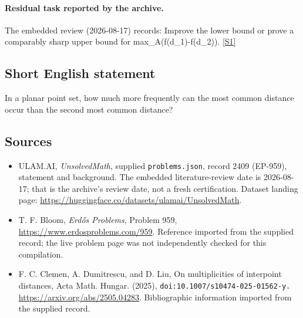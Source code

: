 \documentclass[11pt,a4paper]{article}
\newcommand{\sref}[2]{\hyperlink{source:#1:#2}{[S#2]}}
\begin{document}
\paragraph{Residual task reported by the archive.}

The embedded review (2026-08-17) records: Improve the lower bound or prove a comparably sharp upper bound for max\_A(f(d\_1)-f(d\_2)). \sref{2409}{1}

\subsection{Short English statement}

In a planar point set, how much more frequently can the most common distance occur than the second most common distance?

\subsection{Sources}

{\small

\begin{itemize}

\item[\hypertarget{source:2409:1}{S1}] ULAM.AI, \emph{UnsolvedMath}, supplied \texttt{problems.json}, record 2409 (EP-959), statement and background. The embedded literature-review date is 2026-08-17; that is the archive’s review date, not a fresh certification. Dataset landing page: \url{https://huggingface.co/datasets/ulamai/UnsolvedMath}.

\item[\hypertarget{source:2409:2}{S2}] T. F. Bloom, \emph{Erdős Problems}, Problem 959, \url{https://www.erdosproblems.com/959}. Reference imported from the supplied record; the live problem page was not independently checked for this compilation.

\item[\hypertarget{source:2409:3}{S3}] F. C. Clemen, A. Dumitrescu, and D. Liu, On multiplicities of interpoint distances, Acta Math. Hungar. (2025), \nolinkurl{doi:10.1007/s10474-025-01562-y.} \url{https://arxiv.org/abs/2505.04283}. Bibliographic information imported from the supplied record.

\end{itemize}

}

\label{end:2409}
\end{document}
